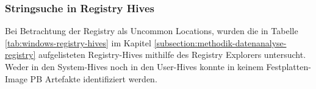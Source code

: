 \begin{appendices}

\subsubsection*{Stringsuche in Registry Hives}
Bei Betrachtung der Registry als Uncommon Locations, wurden die in Tabelle \ref{tab:windows-registry-hives} im Kapitel \ref{subsection:methodik-datenanalyse-registry} aufgelisteten Registry-Hives mithilfe des Registry Explorers untersucht. 
Weder in den System-Hives noch in den User-Hives konnte in keinem Festplatten-Image PB Artefakte identifiziert werden. 


	
\end{appendices}